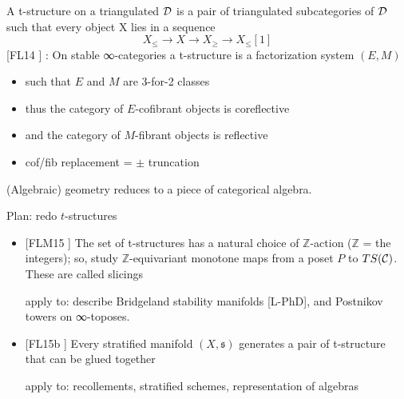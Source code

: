 \documentclass{beamer}
\def\lnk#1{\href{#1}{\faFilePdfO}}
\begin{document}
%
%
%
%
%
\begin{frame}
  A t-structure on a triangulated $\cal D$ is a pair of triangulated subcategories of $\cal D$ such that every object X lies in a sequence
\[X_{\le} \to X \to X_\ge \to X_\le[1]\]
[\alert{FL14} \lnk{https://link.springer.com/article/10.1007/s10485-015-9393-z}] : On stable ∞-categories a t-structure is a factorization system $(E,M)$
\begin{itemize}
\item<+-> such that $E$ and $M$ are 3-for-2 classes
\item<+-> thus the category of $E$-cofibrant objects is coreflective
\item<+-> and the category of $M$-fibrant objects is reflective
\item<+-> cof/fib replacement = $\pm$ truncation
\end{itemize}
(Algebraic) geometry reduces to a piece of categorical algebra.
\end{frame}
%
%
%
\begin{frame}{Plan: redo $t$-structures}
  \begin{itemize}
\item<+-> {} [\alert{FLM15} \lnk{https://link.springer.com/article/10.1007/s40062-019-00237-0}] The set of t-structures has a natural choice of $\mathbb Z$-action ($\mathbb Z$ = the integers); so, study $\mathbb Z$-equivariant monotone maps from a poset $P$ to $TS(\cal C)$. These are called \alert{slicings}

{\footnotesize apply to: describe Bridgeland stability manifolds [\alert{L-PhD}], and Postnikov towers on ∞-toposes.}

\item<+-> {} [\alert{FL15b} \lnk{https://arxiv.org/abs/1507.03913}] Every stratified manifold $(X,\mathfrak s)$ generates a pair of t-structure that can be glued together

{\footnotesize apply to: recollements, stratified schemes, representation of algebras}

  \end{itemize}
\end{frame}
%
%
%
%
%
\end{document}
